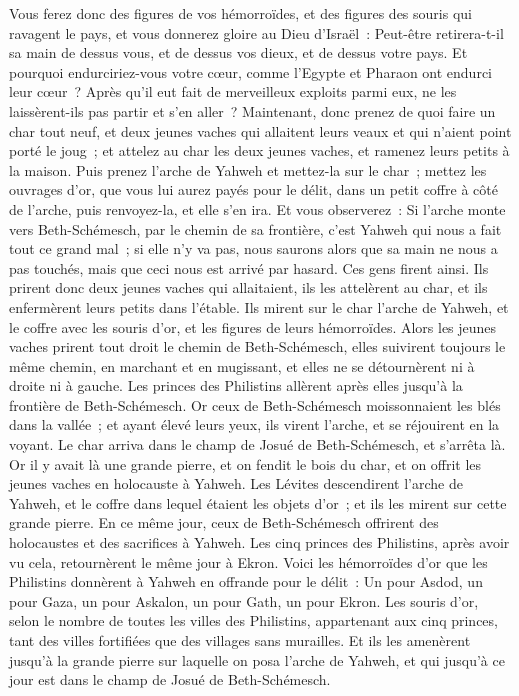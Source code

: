 \begin{multicols}{2}
Vous ferez donc des figures de vos hémorroïdes, et des figures des souris qui ravagent le pays, et vous donnerez gloire au Dieu d'Israël~: Peut-être retirera-t-il sa main de dessus vous, et de dessus vos dieux, et de dessus votre pays.
Et pourquoi endurciriez-vous votre cœur, comme l'Egypte et Pharaon ont endurci leur cœur~? Après qu'il eut fait de merveilleux exploits parmi eux, ne les laissèrent-ils pas partir et s'en aller~?
Maintenant, donc prenez de quoi faire un char tout neuf, et deux jeunes vaches qui allaitent leurs veaux et qui n'aient point porté le joug~; et attelez au char les deux jeunes vaches, et ramenez leurs petits à la maison.
Puis prenez l'arche de Yahweh et mettez-la sur le char~; mettez les ouvrages d'or, que vous lui aurez payés pour le délit, dans un petit coffre à côté de l'arche, puis renvoyez-la, et elle s'en ira.
Et vous observerez~: Si l'arche monte vers Beth-Schémesch, par le chemin de sa frontière, c'est Yahweh qui nous a fait tout ce grand mal~; si elle n'y va pas, nous saurons alors que sa main ne nous a pas touchés, mais que ceci nous est arrivé par hasard.
Ces gens firent ainsi. Ils prirent donc deux jeunes vaches qui allaitaient, ils les attelèrent au char, et ils enfermèrent leurs petits dans l'étable.
Ils mirent sur le char l'arche de Yahweh, et le coffre avec les souris d'or, et les figures de leurs hémorroïdes.
Alors les jeunes vaches prirent tout droit le chemin de Beth-Schémesch, elles suivirent toujours le même chemin, en marchant et en mugissant, et elles ne se détournèrent ni à droite ni à gauche. Les princes des Philistins allèrent après elles jusqu'à la frontière de Beth-Schémesch.
Or ceux de Beth-Schémesch moissonnaient les blés dans la vallée~; et ayant élevé leurs yeux, ils virent l'arche, et se réjouirent en la voyant.
Le char arriva dans le champ de Josué de Beth-Schémesch, et s'arrêta là. Or il y avait là une grande pierre, et on fendit le bois du char, et on offrit les jeunes vaches en holocauste à Yahweh.
Les Lévites descendirent l'arche de Yahweh, et le coffre dans lequel étaient les objets d'or~; et ils les mirent sur cette grande pierre. En ce même jour, ceux de Beth-Schémesch offrirent des holocaustes et des sacrifices à Yahweh.
Les cinq princes des Philistins, après avoir vu cela, retournèrent le même jour à Ekron.
Voici les hémorroïdes d'or que les Philistins donnèrent à Yahweh en offrande pour le délit~: Un pour Asdod, un pour Gaza, un pour Askalon, un pour Gath, un pour Ekron.
Les souris d'or, selon le nombre de toutes les villes des Philistins, appartenant aux cinq princes, tant des villes fortifiées que des villages sans murailles. Et ils les amenèrent jusqu'à la grande pierre sur laquelle on posa l'arche de Yahweh, et qui jusqu'à ce jour est dans le champ de Josué de Beth-Schémesch.

\end{multicols}

